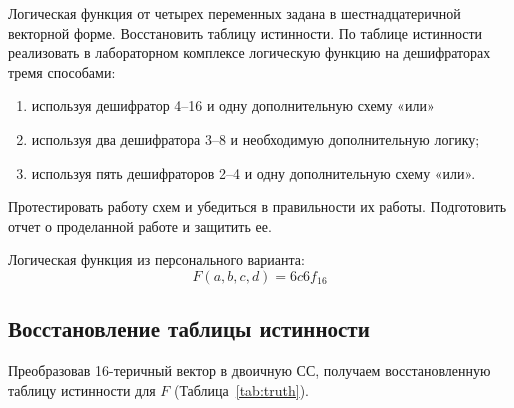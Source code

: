 \documentclass[a4paper]{article}
\author{Буренин А.А}
\begin{document}

    \tableofcontents{}

    \clearpage


    \introduction
    Логическая функция от четырех переменных задана в шестнадцатеричной векторной форме.
    Восстановить таблицу истинности.
    По таблице истинности реализовать в лабораторном комплексе
    логическую функцию на дешифраторах тремя способами:
    \begin{enumerate}
        \item используя дешифратор 4--16 и одну дополнительную схему «или»
        \item используя два дешифратора 3--8 и необходимую дополнительную логику;
        \item используя пять дешифраторов 2--4 и одну дополнительную схему «или».
    \end{enumerate}

    Протестировать работу схем и убедиться в правильности их работы.
    Подготовить отчет о проделанной работе и защитить ее.

    Логическая функция из персонального варианта:
    \[ F(a, b, c, d) = 6c6f_{16} \]


    \implementation

    \subsection{Восстановление таблицы истинности}\label{subsec:table-recovering}
    Преобразовав 16-теричный вектор в двоичную СС, получаем восстановленную таблицу
    истинности для $ F $ (Таблица~\ref{tab:truth}).
\end{document}
